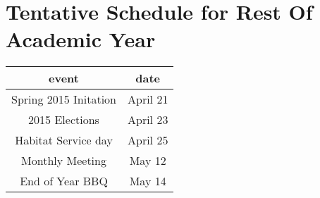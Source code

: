 \documentclass{article}
\begin{document}
\section{Tentative Schedule for Rest Of Academic Year}

    \centering
    \begin{tabular}{| c | c |}
    \hline 
    event & date \\ 
    \hline\hline
    Spring 2015 Initation & April 21 \\ 
    2015 Elections & April 23 \\ 
    Habitat Service day & April 25 \\ 
    Monthly Meeting & May 12 \\ 
    End of Year BBQ & May 14 \\
    \hline
    \end{tabular}
\end{document}
